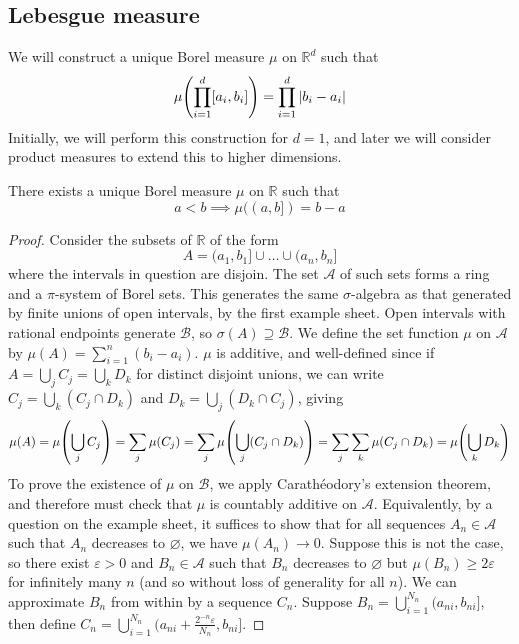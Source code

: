 \subsection{Lebesgue measure}
We will construct a unique Borel measure \( \mu \) on \( \mathbb R^d \) such that
\[ \mu\qty(\prod_{i=1}^d [a_i, b_i]) = \prod_{i=1}^d \abs{b_i - a_i} \]
Initially, we will perform this construction for \( d = 1 \), and later we will consider product measures to extend this to higher dimensions.
\begin{theorem}
	There exists a unique Borel measure \( \mu \) on \( \mathbb R \) such that
	\[ a < b \implies \mu((a,b]) = b - a \]
\end{theorem}
\begin{proof}
	Consider the subsets of \( \mathbb R \) of the form
	\[ A = (a_1,b_1] \cup \dots \cup (a_n,b_n] \]
	where the intervals in question are disjoin.
	The set \( \mathcal A \) of such sets forms a ring and a \( \pi \)-system of Borel sets.
	This generates the same \( \sigma \)-algebra as that generated by finite unions of open intervals, by the first example sheet.
	Open intervals with rational endpoints generate \( \mathcal B \), so \( \sigma(A) \supseteq \mathcal B \).
	We define the set function \( \mu \) on \( \mathcal A \) by \( \mu(A) = \sum_{i=1}^n (b_i - a_i) \).
	\( \mu \) is additive, and well-defined since if \( A = \bigcup_j C_j = \bigcup_k D_k \) for distinct disjoint unions, we can write \( C_j = \bigcup_k (C_j \cap D_k) \) and \( D_k = \bigcup_j (D_k \cap C_j) \), giving
	\[ \mu(A) = \mu\qty(\bigcup_j C_j) = \sum_j \mu(C_j) = \sum_j \mu\qty(\bigcup_j (C_j \cap D_k)) = \sum_j \sum_k \mu(C_j \cap D_k) = \mu\qty(\bigcup_k D_k) \]
	To prove the existence of \( \mu \) on \( \mathcal B \), we apply Carath\'eodory's extension theorem, and therefore must check that \( \mu \) is countably additive on \( \mathcal A \).
	Equivalently, by a question on the example sheet, it suffices to show that for all sequences \( A_n \in \mathcal A \) such that \( A_n \) decreases to \( \varnothing \), we have \( \mu(A_n) \to 0 \).
	Suppose this is not the case, so there exist \( \varepsilon > 0 \) and \( B_n \in \mathcal A \) such that \( B_n \) decreases to \( \varnothing \) but \( \mu(B_n) \geq 2\varepsilon \) for infinitely many \( n \) (and so without loss of generality for all \( n \)).
	We can approximate \( B_n \) from within by a sequence \( C_n \).
	Suppose \( B_n = \bigcup_{i=1}^{N_n} (a_{ni},b_{ni}] \), then define \( C_n = \bigcup_{i=1}^{N_n} (a_{ni}+\frac{2^{-n}\varepsilon}{N_n}, b_{ni}] \).

\end{proof}

